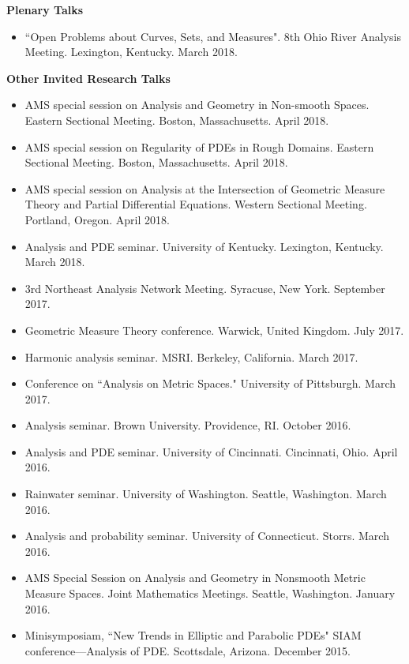 \documentclass[12pt]{amsart}
\newcommand{\ssection}[1]{\noindent\textbf{#1}\vspace{.2cm}}
\newcommand{\esection}{\vspace{.3cm}}
\begin{document}
\esection

\ssection{Plenary Talks}

\begin{itemize}
\item ``Open Problems about Curves, Sets, and Measures". 8th Ohio River Analysis Meeting. Lexington, Kentucky. March 2018.
\end{itemize}

\esection

\ssection{Other Invited Research Talks}

\begin{itemize}

\item AMS special session on Analysis and Geometry in Non-smooth Spaces. Eastern Sectional Meeting. Boston, Massachusetts. April 2018.
\item AMS special session on Regularity of PDEs in Rough Domains. Eastern Sectional Meeting. Boston, Massachusetts. April 2018.
\item AMS special session on Analysis at the Intersection of Geometric Measure Theory and Partial Differential Equations. Western Sectional Meeting. Portland, Oregon. April 2018.
\item Analysis and PDE seminar. University of Kentucky. Lexington, Kentucky. March 2018.
\item 3rd Northeast Analysis Network Meeting. Syracuse, New York. September 2017.
\item Geometric Measure Theory conference. Warwick, United Kingdom. July 2017.
\item Harmonic analysis seminar. MSRI. Berkeley, California. March 2017.
\item Conference on ``Analysis on Metric Spaces." University of Pittsburgh. March 2017.
\item Analysis seminar. Brown University. Providence, RI. October 2016.
\item Analysis and PDE seminar. University of Cincinnati. Cincinnati, Ohio. April 2016.
\item Rainwater seminar. University of Washington. Seattle, Washington. March 2016.
\item Analysis and probability seminar. University of Connecticut. Storrs. March 2016.
\item AMS Special Session on Analysis and Geometry in Nonsmooth Metric Measure Spaces. Joint Mathematics Meetings. Seattle, Washington. January 2016.
\item Minisymposiam, ``New Trends in Elliptic and Parabolic PDEs" SIAM conference---Analysis of PDE. Scottsdale, Arizona. December 2015.

\end{itemize}
\end{document}

